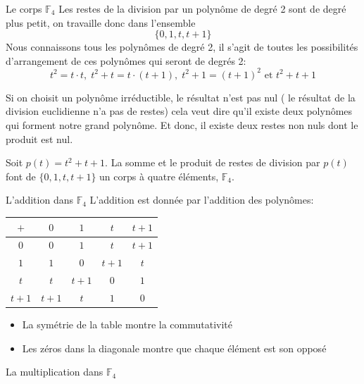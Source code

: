 \begin{parag}{Le corps $\mathbb{F}_4$}
    Les restes de la division par un polynôme de degré 2 sont de degré plus petit, on travaille donc dans l'ensemble
    \[\{0, 1,t, t+1\}\]
    Nous connaissons tous les polynômes de degré 2, il s'agit de toutes les possibilités d'arrangement de ces polynômes qui seront de degrés 2:
    \[t^2 = t\cdot t, \; t^2 + t = t\cdot (t+1), \; t^2 + 1 = (t+1)^2 \text{ et } t^2 + t + 1\]
    \begin{framedremark}
        Si on choisit un polynôme irréductible, le résultat n'est pas nul ( le résultat de la division euclidienne n'a pas de restes) cela veut dire qu'il existe deux polynômes qui forment notre grand polynôme. Et donc, il existe deux restes non nuls dont le produit est nul.
    \end{framedremark}
    \begin{definition}
        Soit $p(t) = t^2 + t + 1$. La somme et le produit de restes de division par $p(t)$ font de $\{0, 1, t, t+1\}$ un corps à quatre éléments, $\mathbb{F}_4$.
    \end{definition}
    \begin{subparag}{L'addition dans $\mathbb{F}_4$}
        L'addition est donnée par l'addition des polynômes:
        \begin{tabular}{|c||c|c|c|c|}
        \hline
            $+$ & $0$ & $1$ & $t$ & $t+1$  \\
            \hline
            \hline
            $0$ & $0$ & $1$ & $t$ & $t+1$ \\
            \hline
            $1$ & $1$ & $0$ & $t+1$ & $t$ \\
            \hline
            $t$ & $t$ & $t+1$ & $0$ & $1$ \\
            \hline
            $t+1$ & $t+1$ & $t$ & $1$ & $0$ \\
            \hline
        \end{tabular}
        \begin{framedremark}
            \begin{itemize}
                \item La symétrie de la table montre la commutativité
                \item Les zéros dans la diagonale montre que chaque élément est son opposé
            \end{itemize}
        \end{framedremark}
    \end{subparag}
    \begin{subparag}{La multiplication dans $\mathbb{F}_4$}

\end{subparag}
\end{parag}
